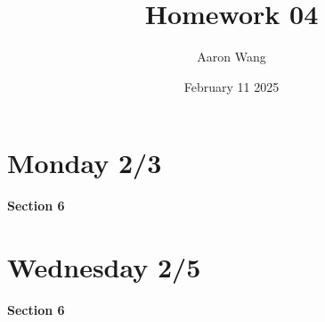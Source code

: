 \documentclass{article}
\title{Homework 04}
\author{Aaron Wang}
\date{February 11 2025}
\begin{document}
\maketitle
\section{Monday 2/3}
\begin{large}
 \textbf{Section 6}   
\end{large}
\begin{enumerate}
    \newpage
    
    \newpage
    
    \newpage
    
    \newpage
    
\end{enumerate}
\newpage
\section{Wednesday 2/5}
\begin{large}
 \textbf{Section 6}   
\end{large}
\begin{enumerate}
    \newpage
    \newpage
    \newpage
    \newpage
    \newpage
    \newpage
    \newpage
    
\end{enumerate}
\end{document}
